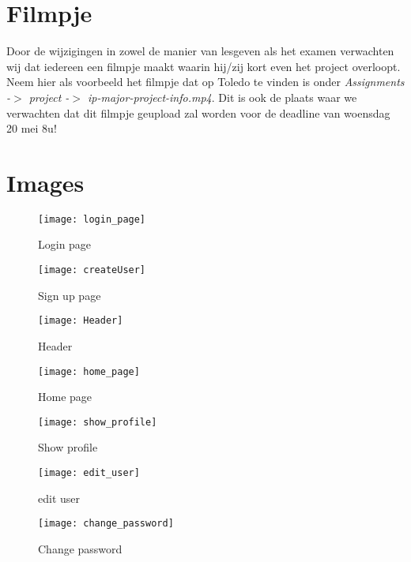 \documentclass{article}
\begin{document}
\section{Filmpje}
Door de wijzigingen in zowel de manier van lesgeven als het examen verwachten wij dat iedereen een filmpje maakt waarin hij/zij kort even het project overloopt. Neem hier als voorbeeld het filmpje dat op Toledo te vinden is onder \textit{Assignments -$>$ project -$>$ ip-major-project-info.mp4}.
Dit is ook de plaats waar we verwachten dat dit filmpje geupload zal worden voor de deadline van woensdag 20 mei 8u!


\pagebreak

\section{Images}

\begin{figure}[!h]
    \centering
    \texttt{[image: login\_page]}
    \caption{Login page}
    \label{fig:login page}
\end{figure}

\begin{figure}[!h]
	\centering
	\texttt{[image: createUser]}
	\caption{Sign up page}
	\label{fig:create user page}
\end{figure}

\begin{figure}[!h]
    \centering
    \texttt{[image: Header]}
    \caption{Header}
    \label{fig:header}
\end{figure}

\begin{figure}[!h]
    \centering
    \texttt{[image: home\_page]}
    \caption{Home page}
    \label{fig:home page}
\end{figure}

\begin{figure}[!h]
    \centering
    \texttt{[image: show\_profile]}
    \caption{Show profile}
    \label{fig:show_profile}
\end{figure}

\begin{figure}[!h]
    \centering
    \texttt{[image: edit\_user]}
    \caption{edit user}
    \label{fig:edit profile}
\end{figure}

\begin{figure}[!h]
    \centering
    \texttt{[image: change\_password]}
    \caption{Change password}
    \label{fig:Change password}
\end{figure}
\end{document}
